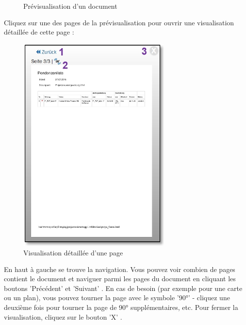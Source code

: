 \begin{figure}[H]
\caption{Prévisualisation d'un document}
\end{figure}

\pagebreak

Cliquez sur une des pages de la prévisualisation pour ouvrir une visualisation détaillée de cette page :

\vspace{\baselineskip}

\begin{figure}   %
  \vspace{-30pt}      %
  \begin{center}
    \includegraphics[height=110mm]{../chapters/11_Dokumentenablage/pictures/11-1-2_VorschauDetails.jpg}
  \end{center}
  \vspace{-20pt}
  \caption{Visualisation détaillée d'une page}
  \vspace{-10pt}
\end{figure}
En haut à gauche se trouve la navigation. Vous pouvez voir combien de pages contient le document et naviguer parmi les pages du document en cliquant les boutons 'Précédent' et 'Suivant' . En cas de besoin (par exemple pour une carte ou un plan), vous pouvez tourner la page avec le symbole '90°' - cliquez une deuxième fois pour tourner la page de 90° supplémentaires, etc. Pour fermer la visualisation, cliquez sur le bouton 'X' .

